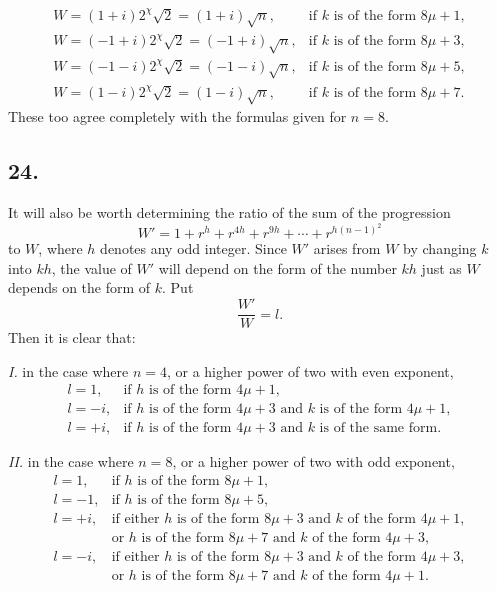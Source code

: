 \documentclass[12pt]{article}
\begin{document}
\[
\begin{array}{ll}
W=(1+i)2^\chi\sqrt2=(1+i)\sqrt n, & \text{if }k\text{ is of the form }8\mu+1,\\
W=(-1+i)2^\chi\sqrt2=(-1+i)\sqrt n, & \text{if }k\text{ is of the form }8\mu+3,\\
W=(-1-i)2^\chi\sqrt2=(-1-i)\sqrt n, & \text{if }k\text{ is of the form }8\mu+5,\\
W=(1-i)2^\chi\sqrt2=(1-i)\sqrt n, & \text{if }k\text{ is of the form }8\mu+7.
\end{array}
\]
These too agree completely with the formulas given for $n=8$.

\subsection*{24.}

It will also be worth determining the ratio of the sum of the progression
\[
W'=1+r^h+r^{4h}+r^{9h}+\cdots+r^{h(n-1)^2}
\]
to $W$, where $h$ denotes any odd integer. Since $W'$ arises from $W$ by changing $k$ into $kh$, the value of $W'$ will depend on the form of the number $kh$ just as $W$ depends on the form of $k$. Put
\[
\frac{W'}{W}=l.
\]
Then it is clear that:

\emph{I.} in the case where $n=4$, or a higher power of two with even exponent,
\[
\begin{array}{ll}
l=1, & \text{if }h\text{ is of the form }4\mu+1,\\
l=-i, & \text{if }h\text{ is of the form }4\mu+3\text{ and }k\text{ is of the form }4\mu+1,\\
l=+i, & \text{if }h\text{ is of the form }4\mu+3\text{ and }k\text{ is of the same form.}
\end{array}
\]

\emph{II.} in the case where $n=8$, or a higher power of two with odd exponent,
\[
\begin{array}{ll}
l=1, & \text{if }h\text{ is of the form }8\mu+1,\\
l=-1, & \text{if }h\text{ is of the form }8\mu+5,\\
l=+i, & \text{if either }h\text{ is of the form }8\mu+3\text{ and }k\text{ of the form }4\mu+1,\\
&\text{or }h\text{ is of the form }8\mu+7\text{ and }k\text{ of the form }4\mu+3,\\
l=-i, & \text{if either }h\text{ is of the form }8\mu+3\text{ and }k\text{ of the form }4\mu+3,\\
&\text{or }h\text{ is of the form }8\mu+7\text{ and }k\text{ of the form }4\mu+1.
\end{array}
\]
\end{document}
